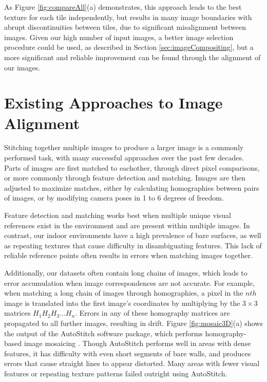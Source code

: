\documentclass[]{spie}  %
\begin{document}
As Figure \ref{fig:compareAll}(a) demonstrates, this approach leads to
the best texture for each tile independently, but results in many
image boundaries with abrupt discontinuities between tiles, due to
significant misalignment between images. Given our high number of input images, a better image selection procedure could be used, as described in Section \ref{sec:imageCompositing}, but a more significant and reliable improvement can be found through the alignment of our images.

\section{Existing Approaches to Image Alignment}
\label{sec:existingApproaches}
Stitching together multiple images to produce a larger image is a
commonly performed task, with many successful approaches over the past
few decades. Parts of images are first matched to eachother, through
direct pixel comparisons, or more commonly through feature detection
and matching. Images are then adjusted to maximize matches, either by
calculating homographies between pairs of images, or by modifying
camera poses in 1 to 6 degrees of freedom.

Feature detection and matching works best when multiple unique visual
references exist in the environment and are present within multiple
images. In contrast, our indoor environments have a high prevalence of
bare surfaces, as well as repeating textures that cause difficulty in
disambiguating features. This lack of reliable reference points often
results in errors when matching images together.

Additionally, our datasets often contain long chains of images, which
leads to error accumulation when image correspondences are not
accurate. For example, when matching a long chain of images through
homographies, a pixel in the $nth$ image is translated into the
first image's coordinates by multiplying by the $3\times3$ matrices $H_1
H_2 H_3 ... H_n$. Errors in any of these homography matrices are
propagated to all further images, resulting in drift. Figure
\ref{fig:mosaic3D}(a) shows the output of the AutoStitch software
package, which performs homography-based image mosaicing
\cite{autostitch}. Though AutoStitch performs well in areas with dense
features, it has difficulty with even short segments of bare walls,
and produces errors that cause straight lines to appear
distorted. Many areas with fewer visual features or repeating texture patterns failed
outright using AutoStitch.
\end{document}
